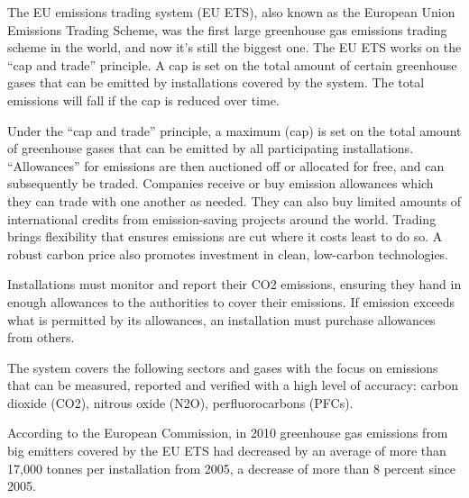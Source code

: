 The EU emissions trading system (EU ETS)\cite{watanabe2005european}, also known as the European Union Emissions Trading Scheme, 
was the first large greenhouse gas emissions trading scheme in the world, and now it's still the biggest one. 
The EU ETS works on the ``cap and trade'' principle. A cap is set on the total amount of certain greenhouse gases 
that can be emitted by installations covered by the system. The total emissions will fall if the cap is reduced 
over time. 

Under the ``cap and trade'' principle, a maximum (cap) is set on the total amount of greenhouse gases that can be 
emitted by all participating installations. ``Allowances'' for emissions are then auctioned off or allocated for 
free, and can subsequently be traded. Companies receive or buy emission allowances which they can trade with one 
another as needed. They can also buy limited amounts of international credits from emission-saving projects around 
the world. Trading brings flexibility that ensures emissions are cut where it costs least to do so. A robust carbon 
price also promotes investment in clean, low-carbon technologies.

Installations must monitor and report their CO2 emissions, ensuring they hand in enough allowances to the authorities 
to cover their emissions. If emission exceeds what is permitted by its allowances, an installation must purchase 
allowances from others.

The system covers the following sectors and gases with the focus on emissions that can be measured, reported 
and verified with a high level of accuracy: carbon dioxide (CO2), nitrous oxide (N2O), perfluorocarbons (PFCs).

According to the European Commission, in 2010 greenhouse gas emissions from big emitters covered by the EU ETS 
had decreased by an average of more than 17,000 tonnes per installation from 2005, a decrease of more than 8 percent since 2005.